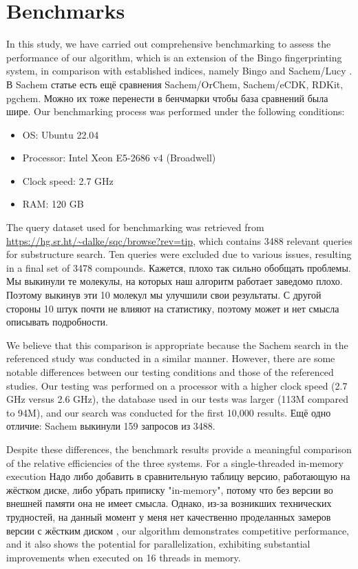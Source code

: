 \section{Benchmarks}

In this study, we have carried out comprehensive benchmarking to assess the performance of our algorithm, which is an extension 
of the Bingo fingerprinting system, in comparison with established indices, namely Bingo {\color{red}\cite{Pavlov2010}} and Sachem/Lucy {\color{red} \cite{Kratochvil2018}}.
{\color{red} В Sachem статье есть ещё сравнения Sachem/OrChem, Sachem/eCDK, RDKit, pgchem. Можно их тоже перенести в бенчмарки чтобы база сравнений была шире.}
Our benchmarking process 
was performed under the following conditions:

\begin{itemize}
\item OS: Ubuntu 22.04
\item Processor: Intel Xeon E5-2686 v4 (Broadwell)
\item Clock speed: 2.7 GHz
\item RAM: 120 GB
\end{itemize}

The query dataset used for benchmarking was retrieved from \url{https://hg.sr.ht/~dalke/sqc/browse?rev=tip}, which contains 3488 
relevant queries for substructure search. Ten queries were excluded due to various issues, resulting in a final set of 3478 compounds.
{\color{red} Кажется, плохо так сильно обобщать проблемы. Мы выкинули те молекулы, на которых наш алгоритм работает заведомо плохо. Поэтому выкинув эти 10 молекул мы улучшили свои результаты. С другой стороны 10 штук почти не влияют на статистику, поэтому может и нет смысла описывать подробности}.

We believe that this comparison is appropriate because the Sachem search in the referenced study was conducted in a similar manner. 
However, there are some notable differences between our testing conditions and those of the referenced studies. Our testing was 
performed on a processor with a higher clock speed (2.7 GHz versus 2.6 GHz), the database used in our tests was larger (113M 
compared to 94M), and our search was conducted for the first 10,000 results.
{\color{red} Ещё одно отличие: Sachem выкинули 159 запросов из 3488.}

Despite these differences, the benchmark results provide a meaningful comparison of the relative efficiencies of the three systems. 
For a single-threaded in-memory execution
{\color{red} Надо либо добавить в сравнительную таблицу версию, работающую на жёстком диске, либо убрать приписку "in-memory", потому что без версии во внешней памяти она не имеет смысла. Однако, из-за возникших технических трудностей, на данный момент у меня нет качественно проделанных замеров версии с жёстким диском}
, our algorithm demonstrates competitive performance, and it also shows the potential for 
parallelization, exhibiting substantial improvements when executed on 16 threads in memory.

